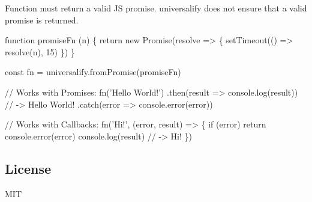 Function must return a valid JS promise. {\ttfamily universalify} does not ensure that a valid promise is returned.


\begin{DoxyCode}
function promiseFn (n) \{
  return new Promise(resolve => \{
    setTimeout(() => resolve(n), 15)
  \})
\}

const fn = universalify.fromPromise(promiseFn)

// Works with Promises:
fn('Hello World!')
.then(result => console.log(result)) // -> Hello World!
.catch(error => console.error(error))

// Works with Callbacks:
fn('Hi!', (error, result) => \{
  if (error) return console.error(error)
  console.log(result)
  // -> Hi!
\})
\end{DoxyCode}


\subsection*{License}

M\+IT 